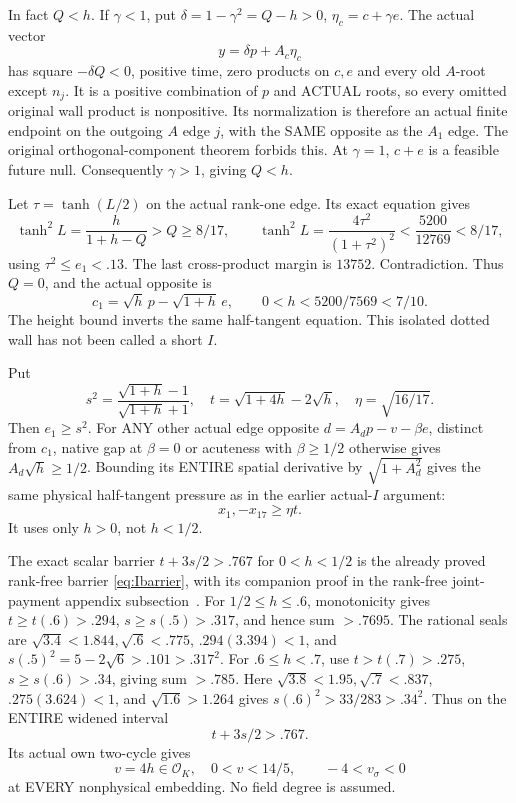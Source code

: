 \documentclass[11pt]{article}
\begin{document}
In fact \(Q<h\).
If \(\gamma<1\), put
\(\delta=1-\gamma^2=Q-h>0\),
\(\eta_c=c+\gamma e\).
The actual vector
\[
                         y=\delta p+A_c\eta_c
\]
has square \(-\delta Q<0\), positive
time, zero products on \(c,e\) and
every old \(A\)-root except \(n_j\).
It is a positive combination of \(p\)
and ACTUAL roots, so every omitted
original wall product is nonpositive.
Its normalization is therefore an actual
finite endpoint on the outgoing \(A\)
edge \(j\), with the SAME opposite
as the \(A_1\) edge.
The original orthogonal-component theorem
forbids this.
At \(\gamma=1\), \(c+e\) is a feasible
future null.
Consequently \(\gamma>1\), giving \(Q<h\).

Let \(\tau=\tanh(L/2)\) on the actual
rank-one edge.
Its exact equation gives
\[
 \tanh^2L={\frac{h}{1+h-Q}}>Q\ge8/17,
 \qquad
 \tanh^2L={\frac{4\tau^2}{(1+\tau^2)^2}}
                       <{\frac{5200}{12769}}<8/17 ,
\]
using \(\tau^2\le e_1<.13\).
The last cross-product margin is \(13752\).
Contradiction.
Thus \(Q=0\), and the actual opposite is
\[
                   c_1=\sqrt h\,p-\sqrt{1+h}\,e,\qquad
                    0<h<5200/7569<7/10 .
\tag{A16r1}\label{eq:arithA16rankoneisolated}
\]
The height bound inverts the same
half-tangent equation.
This isolated dotted wall has not been
called a short \(I\).

Put
\[
 s^2={\frac{\sqrt{1+h}-1}{\sqrt{1+h}+1}},\quad
 t=\sqrt{1+4h}-2\sqrt h,\quad\eta=\sqrt{16/17}.
\]
Then \(e_1\ge s^2\).
For ANY other actual edge opposite
\(d=A_dp-v-\beta e\), distinct from
\(c_1\), native gap at \(\beta=0\) or
acuteness with \(\beta\ge1/2\) otherwise
gives \(A_d\sqrt h\ge1/2\).
Bounding its ENTIRE spatial derivative by
\(\sqrt{1+A_d^2}\) gives the same physical
half-tangent pressure as in the earlier
actual-\(I\) argument:
\[
                       x_1,-x_{17}\ge\eta t .
\]
It uses only \(h>0\), not \(h<1/2\).

The exact scalar barrier \(t+3s/2>.767\)
for \(0<h<1/2\) is the already proved
rank-free barrier \eqref{eq:Ibarrier},
with its companion proof in the rank-free joint-payment appendix subsection~\cite{ProjectGeneral}.
For \(1/2\le h\le.6\), monotonicity gives
\(t\ge t(.6)>.294\), \(s\ge s(.5)>.317\),
and hence sum \(>.7695\).
The rational seals are
\(\sqrt{3.4}<1.844,\sqrt{.6}<.775\),
\(.294(3.394)<1\), and
\(s(.5)^2=5-2\sqrt6>.101>.317^2\).
For \(.6\le h<.7\), use
\(t>t(.7)>.275\), \(s\ge s(.6)>.34\),
giving sum \(>.785\).
Here
\(\sqrt{3.8}<1.95,\sqrt{.7}<.837\),
\(.275(3.624)<1\), and
\(\sqrt{1.6}>1.264\) gives
\(s(.6)^2>33/283>.34^2\).
Thus on the ENTIRE widened interval
\[
                              t+3s/2>.767 .
\]
Its actual own two-cycle gives
\[
 v=4h\in\mathcal O_K,\quad0<v<14/5,\qquad
                        -4<v_\sigma<0
\]
at EVERY nonphysical embedding.
No field degree is assumed.
\end{document}
